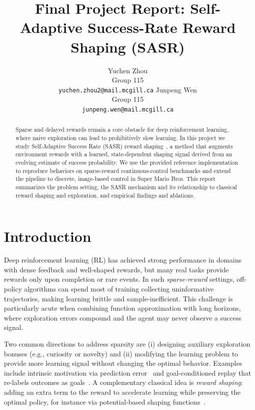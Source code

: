 \documentclass{article}
\title{Final Project Report: Self-Adaptive Success-Rate Reward Shaping (SASR)}
\author{
Yuchen Zhou \\
Group 115 \\
\texttt{yuchen.zhou2@mail.mcgill.ca}
\And
Junpeng Wen \\
Group 115 \\
\texttt{junpeng.wen@mail.mcgill.ca}
}
\begin{document}
\maketitle

\begin{abstract}
Sparse and delayed rewards remain a core obstacle for deep reinforcement learning, where naive exploration can lead to prohibitively slow learning. In this project we study Self-Adaptive Success Rate (SASR) reward shaping~\citep{ma2025sasr}, a method that augments environment rewards with a learned, state-dependent shaping signal derived from an evolving estimate of success probability. We use the provided reference implementation to reproduce behaviors on sparse-reward continuous-control benchmarks and extend the pipeline to discrete, image-based control in Super Mario Bros. This report summarizes the problem setting, the SASR mechanism and its relationship to classical reward shaping and exploration, and empirical findings and ablations.
\end{abstract}

\section{Introduction}
\label{sec:introduction}

Deep reinforcement learning (RL) has achieved strong performance in domains with dense feedback and well-shaped rewards, but many real tasks provide rewards only upon completion or rare events. In such \emph{sparse-reward} settings, off-policy algorithms can spend most of training collecting uninformative trajectories, making learning brittle and sample-inefficient. This challenge is particularly acute when combining function approximation with long horizons, where exploration errors compound and the agent may never observe a success signal.

Two common directions to address sparsity are (i) designing auxiliary exploration bonuses (e.g., curiosity or novelty) and (ii) modifying the learning problem to provide more learning signal without changing the optimal behavior. Examples include intrinsic motivation via prediction error~\citep{burda2018rnd} and goal-conditioned replay that re-labels outcomes as goals~\citep{andrychowicz2017her}. A complementary classical idea is \emph{reward shaping}: adding an extra term to the reward to accelerate learning while preserving the optimal policy, for instance via potential-based shaping functions~\citep{ng1999policy}.
\end{document}
